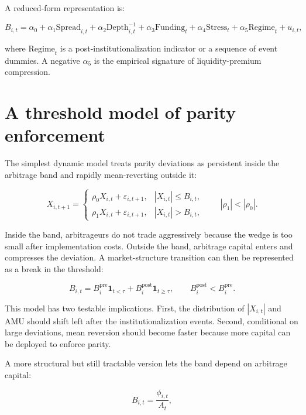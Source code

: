\documentclass[12pt]{article}
\begin{document}
A reduced-form representation is:

\begin{equation}
B_{i,t}=\alpha_0+\alpha_1\mathrm{Spread}_{i,t}+\alpha_2\mathrm{Depth}^{-1}_{i,t}+\alpha_3\mathrm{Funding}_{t}+\alpha_4\mathrm{Stress}_{t}+\alpha_5\mathrm{Regime}_{t}+u_{i,t},
\end{equation}

where $\mathrm{Regime}_{t}$ is a post-institutionalization indicator or a sequence of event dummies. A negative $\alpha_5$ is the empirical signature of liquidity-premium compression.

\section{A threshold model of parity enforcement}

The simplest dynamic model treats parity deviations as persistent inside the arbitrage band and rapidly mean-reverting outside it:

\begin{equation}
X_{i,t+1}=\begin{cases}
\rho_{0}X_{i,t}+\varepsilon_{i,t+1}, & |X_{i,t}|\leq B_{i,t},\\
\rho_{1}X_{i,t}+\varepsilon_{i,t+1}, & |X_{i,t}|>B_{i,t},
\end{cases}
\qquad |\rho_1|<|\rho_0|.
\end{equation}

Inside the band, arbitrageurs do not trade aggressively because the wedge is too small after implementation costs. Outside the band, arbitrage capital enters and compresses the deviation. A market-structure transition can then be represented as a break in the threshold:

\begin{equation}
B_{i,t}=B_{i}^{\mathrm{pre}}\mathbf{1}_{t<\tau}+B_{i}^{\mathrm{post}}\mathbf{1}_{t\geq\tau}, \qquad B_{i}^{\mathrm{post}}<B_{i}^{\mathrm{pre}}.
\end{equation}

This model has two testable implications. First, the distribution of $|X_{i,t}|$ and AMU should shift left after the institutionalization events. Second, conditional on large deviations, mean reversion should become faster because more capital can be deployed to enforce parity.

A more structural but still tractable version lets the band depend on arbitrage capital:

\begin{equation}
B_{i,t}=\frac{\phi_{i,t}}{A_t},
\end{equation}
\end{document}
